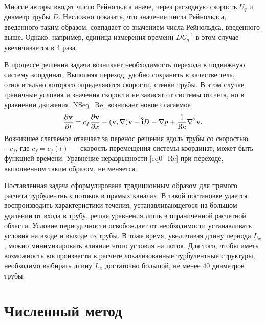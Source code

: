 Многие авторы вводят число Рейнольдса иначе, через расходную скорость $U_q$ и диаметр трубы $D$. Несложно показать, что значение числа Рейнольдса, введенного таким образом, совпадает со значением числа Рейнольдса, введенного выше. Однако, например, единица измерения времени $DU_q^{-1}$ в этом случае увеличивается в 4 раза.

В процессе решения задачи возникает необходимость перехода в подвижную систему координат. Выполняя переход, удобно сохранить в качестве тела, относительно которого определяются скорости, стенки трубы. В этом случае граничные условия и значения скорости не зависят от системы отсчета, но в уравнении движения \eqref{NSeq_Re} возникает новое слагаемое
\begin{equation}\label{NSeq_cf}
\frac{\partial \mathbf{v}}{\partial t} = c_f \frac{\partial \mathbf{v}}{\partial x} - (\mathbf{v}, \nabla) \mathbf{v} - \mathbf{\hat{i}} D - \nabla p + \frac{1}{\operatorname{Re}} \nabla^2 \mathbf{v}. 
\end{equation}
Возникшее слагаемое отвечает за перенос решения вдоль трубы со скоростью $-c_f$, где $c_f = c_f(t)$ --- скорость перемещения системы координат, может быть функцией времени. Уравнение неразрывности \eqref{eq0_Re} при переходе, выполненном таким образом, не меняется. 


Поставленная задача сформулирована традиционным образом для прямого расчета турбулентных потоков в прямых каналах. В такой постановке удается воспроизводить характеристики течения, устанавливающегося на большом удалении от входа в трубу, решая уравнения лишь в ограниченной расчетной области. Условие периодичности освобождает от необходимости устанавливать условия на входе и выходе из трубы. В тоже время, увеличивая длину периода $L_x$, можно минимизировать влияние этого условия на поток. Для того, чтобы иметь возможность воспроизвести в расчете локализованные турбулентные структуры, необходимо выбирать длину $L_x$ достаточно большой, не менее $40$ диаметров трубы. 


\section{Численный метод} \label{num_method}

\begin{comment}
Поставленная задача решается численно конечно-разностным методом \cite{nikitin2006method}. Метод формулируется относительно уравнения движения \eqref{NSeq_Re}, преобразованного к виду 
\begin{equation}\label{NSeq_om}
\pd{\v}{t} = - \i D + \v \times \om - \nabla P - \frac{1}{\Re} \rot \om
\end{equation}
Здесь $\om = \rot \v$ --- вектор завихренности, посчитанный по полю скорости $\v$, $P = p + |\v|^2/2$ --- полное кинематическое давление. Эквивалентность уравнений \eqref{NSeq_Re} и \eqref{NSeq_om} следует из векторных тождеств
\begin{equation*}
-(\v, \nabla) \v = \v \times \rot \v - \nabla |\v|^2/2,
\end{equation*}
\begin{equation*}
\nabla^2 \v = \grad \div \v - \rot \rot \v.
\end{equation*}
\end{comment}

